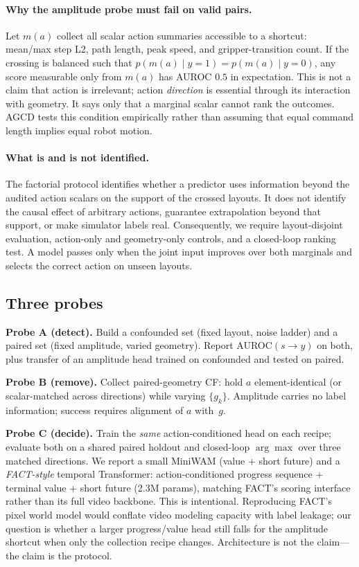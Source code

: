 \documentclass[conference]{IEEEtran}
\begin{document}
\paragraph{Why the amplitude probe must fail on valid pairs.}
Let $m(a)$ collect all scalar action summaries accessible to a shortcut:
mean/max step L2, path length, peak speed, and gripper-transition count. If the
crossing is balanced such that
$p(m(a)\mid y{=}1)=p(m(a)\mid y{=}0)$, any score measurable only from $m(a)$
has AUROC $0.5$ in expectation. This is not a claim that action is irrelevant;
action \emph{direction} is essential through its interaction with geometry.
It says only that a marginal scalar cannot rank the outcomes. AGCD tests this
condition empirically rather than assuming that equal command length implies
equal robot motion.

\paragraph{What is and is not identified.}
The factorial protocol identifies whether a predictor uses information beyond
the audited action scalars on the support of the crossed layouts. It does not
identify the causal effect of arbitrary actions, guarantee extrapolation beyond
that support, or make simulator labels real. Consequently, we require
layout-disjoint evaluation, action-only and geometry-only controls, and a
closed-loop ranking test. A model passes only when the joint input improves over
both marginals and selects the correct action on unseen layouts.

\subsection{Three probes}
\textbf{Probe A (detect).} Build a confounded set (fixed layout, noise ladder)
and a paired set (fixed amplitude, varied geometry). Report
AUROC$(s\rightarrow y)$ on both, plus transfer of an amplitude head trained on
confounded and tested on paired.

\textbf{Probe B (remove).} Collect paired-geometry CF: hold $a$
element-identical (or scalar-matched across directions) while varying $\{g_k\}$.
Amplitude carries no label information; success requires alignment of $a$
with~$g$.

\textbf{Probe C (decide).} Train the \emph{same} action-conditioned head on each
recipe; evaluate both on a shared paired holdout and closed-loop $\arg\max$ over
three matched directions. We report a small MiniWAM (value + short future) and a
\emph{FACT-style} temporal Transformer: action-conditioned progress sequence +
terminal value + short future (2.3M params), matching FACT's scoring interface
rather than its full video backbone. This is intentional. Reproducing FACT's
pixel world model would conflate video modeling capacity with label leakage; our
question is whether a larger progress/value head still falls for the amplitude
shortcut when only the collection recipe changes. Architecture is not the
claim---the claim is the protocol.
\end{document}
